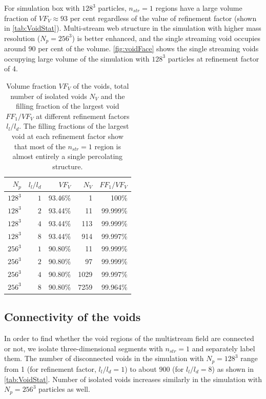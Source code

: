 \documentclass[fleqn,usenatbib,useAMS]{mnras}
\begin{document}
For simulation box with $128^3$ particles, $n_{str} = 1$ regions have a large volume fraction of $VF_V \approx 93$ per cent regardless of the value of refinement factor (shown in \autoref{tab:VoidStat}). Multi-stream web structure in the simulation with higher mass resolution ($N_p = 256^3$) is better enhanced, and the single streaming void occupies around $90$ per cent of the volume. \autoref{fig:voidFace} shows the single streaming voids occupying large volume of the simulation with $128^3$ particles at refinement factor of 4. 

\begin{table}
  \caption{Volume fraction $VF_V$ of the voids, total number of isolated voids $N_V$ and the filling fraction of the largest void  $FF_1/VF_V$ at different refinement factors $l_l/l_d$. The filling fractions of the largest void at each refinement factor show that most of the $n_{str} = 1 $ region is almost entirely a single percolating structure.}
\begin{tabular}{|r|r|r|r|r| }
\hline
$N_p$ & $l_l/l_d$ & $VF_V$ & $N_V$ & $FF_1/VF_V$  \\  \hline
$ 128^3$      & $ 1$      & 93.46\%   & 1    & 100\% \\ \hline
$ 128^3$      & $ 2$      & 93.44\%   & 11   & 99.999\% \\ \hline
$ 128^3$      & $ 4$      & 93.44\%   & 113  & 99.999\% \\ \hline
$ 128^3$      & $ 8$      & 93.44\%   & 914  & 99.997\% \\ \hline
$ 256^3$      & $ 1$      & 90.80\%   & 11   & 99.999\% \\ \hline
$ 256^3$      & $ 2$      & 90.80\%   & 97   & 99.999\% \\ \hline
$ 256^3$      & $ 4$      & 90.80\%   & 1029 & 99.997\% \\ \hline
$ 256^3$      & $ 8$      & 90.80\%   & 7259 & 99.964\% \\ \hline

\end{tabular}
\label{tab:VoidStat}
\end{table}



\subsection{Connectivity of the voids}
\label{sec:voidPerc}




In order to find whether the void regions of the multistream field are connected or not, we isolate three-dimensional segments with $n_{str} = 1$ and separately label them. The number of disconnected voids in the simulation with $N_p = 128^3$ range from 1 (for refinement factor, $l_l/l_d =  1$) to about $900$ (for $l_l/l_d= 8$) as shown in \autoref{tab:VoidStat}. Number of isolated voids increases similarly in the simulation with $N_p = 256^3$ particles as well. 
\end{document}

